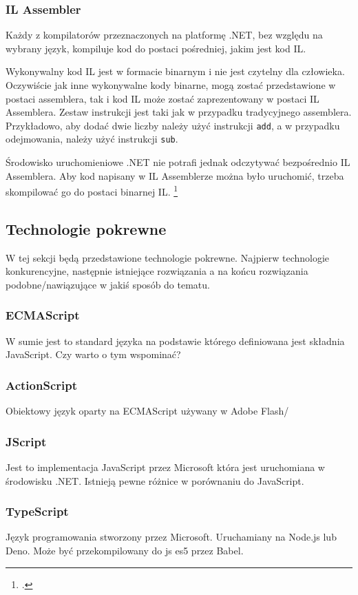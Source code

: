 \documentclass[a4paper]{article}
\begin{document}
\subsubsection{IL Assembler}
\par Każdy z kompilatorów przeznaczonych na platformę .NET, bez względu na wybrany język, kompiluje kod do postaci pośredniej, jakim jest kod IL.
\par Wykonywalny kod IL jest w formacie binarnym i nie jest czytelny dla człowieka. Oczywiście jak inne wykonywalne kody binarne, mogą zostać przedstawione w postaci assemblera, tak i kod IL może zostać zaprezentowany w postaci IL Assemblera. Zestaw instrukcji jest taki jak w przypadku tradycyjnego assemblera. Przykładowo, aby dodać dwie liczby należy użyć instrukcji \texttt{add}, a w przypadku odejmowania, należy użyć instrukcji \texttt{sub}.
\par Środowisko uruchomieniowe .NET nie potrafi jednak odczytywać bezpośrednio IL Assemblera. Aby kod napisany w IL Assemblerze można było uruchomić, trzeba skompilować go do postaci binarnej IL. \footcite{ILAsm1}

\subsection{Technologie pokrewne}
W tej sekcji będą przedstawione technologie pokrewne.
Najpierw technologie konkurencyjne, następnie istniejące rozwiązania a na końcu rozwiązania podobne/nawiązujące w jakiś sposób do tematu.

\subsubsection{ECMAScript}
W sumie jest to standard języka na podstawie którego definiowana jest składnia JavaScript. Czy warto o tym wspominać?

\subsubsection{ActionScript}
Obiektowy język oparty na ECMAScript używany w Adobe Flash/

\subsubsection{JScript}
Jest to implementacja JavaScript przez Microsoft która jest uruchomiana w środowisku .NET.
Istnieją pewne różnice w porównaniu do JavaScript.

\subsubsection{TypeScript}
Język programowania stworzony przez Microsoft. Uruchamiany na Node.js lub Deno. Może być przekompilowany do js es5 przez Babel.
\end{document}
